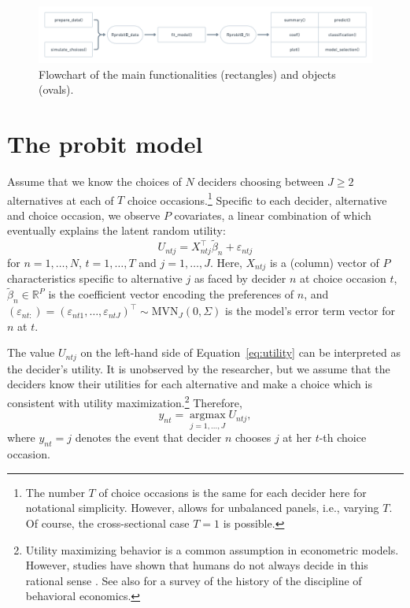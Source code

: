 \documentclass[article,shortnames]{jss}
\begin{document}
\begin{figure}[!ht]
  \centering
  \includegraphics[width=1.0\textwidth]{flowchart.png}
  \caption{Flowchart of the main  functionalities (rectangles) and objects (ovals).}
  \label{fig:flowchart}
\end{figure}

\section{The probit model} \label{sec:probit_model}

Assume that we know the choices of $N$ deciders choosing between $J \geq 2$ alternatives at each of $T$ choice occasions.\footnote{The number $T$ of choice occasions is the same for each decider here for notational simplicity. However,  allows for unbalanced panels, i.e., varying $T$. Of course, the cross-sectional case $T = 1$ is possible.} Specific to each decider, alternative and choice occasion, we observe $P$ covariates, a linear combination of which eventually explains the latent random utility:
%
\begin{equation}
  \label{eq:utility}
  U_{ntj} = X_{ntj}^\top \tilde{\beta}_n + \varepsilon_{ntj}
\end{equation}
%
for $n=1,\dots,N$, $t=1,\dots,T$ and $j=1,\dots,J$. Here, $X_{ntj}$ is a (column) vector of $P$ characteristics specific to alternative $j$ as faced by decider $n$ at choice occasion $t$, $\tilde{\beta}_n \in \mathbb{R}^{P}$ is the coefficient vector encoding the preferences of $n$, and $(\varepsilon_{nt:}) = (\varepsilon_{nt1},\dots,\varepsilon_{ntJ})^\top \sim \text{MVN}_{J} (0,\Sigma)$ is the model's error term vector for $n$ at $t$.

The value $U_{ntj}$ on the left-hand side of Equation~\ref{eq:utility} can be interpreted as the decider's utility. It is unobserved by the researcher, but we assume that the deciders know their utilities for each alternative and make a choice which is consistent with utility maximization.\footnote{Utility maximizing behavior is a common assumption in econometric models. However, studies have shown that humans do not always decide in this rational sense \citep{Tversky:1986, Hewig:2011}. See also \citep{Thaler:2015} for a survey of the history of the discipline of behavioral economics.} Therefore,
%
\begin{equation}
   \label{eq:link}
   y_{nt} = \operatorname*{argmax}_{j = 1,\dots,J} U_{ntj},
\end{equation}
%
where $y_{nt}=j$ denotes the event that decider $n$ chooses $j$ at her $t$-th choice occasion.
\end{document}
